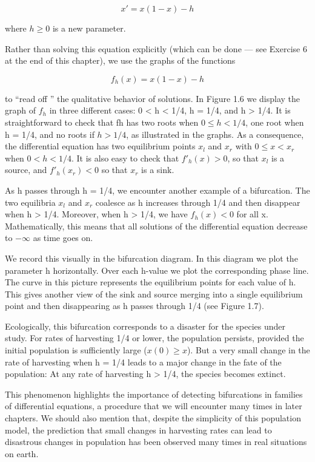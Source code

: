 \documentclass[12pt]{article}
\begin{document}
\[
x' = x(1 - x) - h
\]

where $h \geq 0$ is a new parameter.

Rather than solving this equation explicitly (which can be done — see
Exercise 6 at the end of this chapter), we use the graphs of the functions

\[
f_h(x) = x(1 - x) - h
\]

to “read off ” the qualitative behavior of solutions. In Figure 1.6 we display
the graph of $f_h$ in three different cases: 0 < h < 1/4, h = 1/4, and h > 1/4.
It is straightforward to check that fh has two roots when $0 \leq h < 1/4$, one
root when h = 1/4, and no roots if $h > 1/4$, as illustrated in the graphs. As a consequence, the differential equation has two equilibrium points $x_l$ and $x_r$ with $0 \leq x < x_r$ when $0 < h < 1/4$. 
It is also easy to check that $f'_h (x) > 0$, so
that $x_l$ is a source, and $f'_h (x_r) < 0$ so that $x_r$ is a sink.


As h passes through h = 1/4, we encounter another example of a bifurcation.
The two equilibria $x_l$ and $x_r$ coalesce as h increases through 1/4 and then
disappear when h > 1/4. Moreover, when h > 1/4, we have $f_h(x) < 0$ for all
x. Mathematically, this means that all solutions of the differential equation
decrease to $-\infty$ as time goes on.


We record this visually in the bifurcation diagram. In this diagram we plot
the parameter h horizontally. Over each h-value we plot the corresponding
phase line. The curve in this picture represents the equilibrium points for each
value of h. This gives another view of the sink and source merging into a
single equilibrium point and then disappearing as h passes through 1/4 (see
Figure 1.7).


Ecologically, this bifurcation corresponds to a disaster for the species under
study. For rates of harvesting 1/4 or lower, the population persists, provided the initial population is sufficiently large ($x(0) \geq x$). But a very small change
in the rate of harvesting when h = 1/4 leads to a major change in the fate of
the population: At any rate of harvesting h > 1/4, the species becomes extinct.

This phenomenon highlights the importance of detecting bifurcations in
families of differential equations, a procedure that we will encounter many
times in later chapters. We should also mention that, despite the simplicity of
this population model, the prediction that small changes in harvesting rates
can lead to disastrous changes in population has been observed many times in
real situations on earth.
\end{document}
